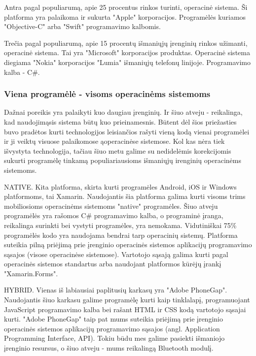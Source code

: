 \documentclass{VUMIFPSkursinis}
\begin{document}
Antra pagal populiarumą, apie 25 procentus rinkos turinti, operacinė sistema. Ši platforma yra palaikoma ir sukurta "Apple" korporacijos. Programėlės kuriamos "Objective-C" arba "Swift" programavimo kalbomis.

Trečia pagal populiarumą, apie 15 procentų išmaniųjų įrenginių rinkos užimanti, operacinė sistema. Tai yra "Microsoft" korporacijos produktas. Operacinė sistema diegiama "Nokia" korporacijos "Lumia" išmaniųjų telefonų linijoje. Programavimo kalba - C\#.

\subsubsection{Viena programėlė - visoms operacinėms sistemoms}
Dažnai poreikis yra palaikyti kuo daugiau įrenginių. Ir šiuo atveju - reikalinga, kad naudojimąsis sistema būtų kuo prieinamesnis. Būtent dėl šios priežasties buvo pradėtos kurti technologijos leisiančios rašyti vieną kodą vienai programėlei ir ji veiktų visuose palaikomose ąoperacinėse sistemose. Kol kas nėra tiek išvystyta technologija, tačiau šiuo metu galime su nedidelėmis korekcijomis sukurti programėlę tinkamą populiariausioms išmaniųjų irenginių operacinėms sistemoms.


NATIVE. Kita platforma, skirta kurti programėles Android, iOS ir Windows platformoms, tai Xamarin. Naudojantis šia platforma galima kurti visoms trims mobiliosioms operacinėms sistemoms "native" programėles. Šiuo atveju programėlės yra rašomos C\# programavimo kalba, o programinė įranga, reikalinga surinkti bei vystyti programėles, yra nemokama. Vidutiniškai 75\% programėlės kodo yra naudojama bendrai tarp operacinių sistemų. Platforma suteikia pilną priėjimą prie įrenginio operacinės sistemos aplikacijų programavimo sąsajos (visose operacinėse sistemose). Vartotojo sąsają galima kurti pagal operacinės sistemos standartus arba naudojant platformos kūrėjų įrankį "Xamarin.Forms".



HYBRID. Vienas iš labiausiai paplitusių karkasų yra "Adobe PhoneGap". Naudojantis šiuo karkasu galime programėlę kurti kaip tinklalapį, programuojant JavaScript programavimo kalba bei rašant HTML ir CSS kodą vartotojo sąsajai kurti. "Adobe PhoneGap" taip pat mums suteikia priėjimą prie įrenginio operacinės sistemos aplikacijų programavimo sąsajos (angl. Application Programming Interface, API). Tokiu būdu mes galime pasiekti išmaniojo įrenginio resursus, o šiuo atveju - mums reikalingą Bluetooth modulį.
\end{document}
